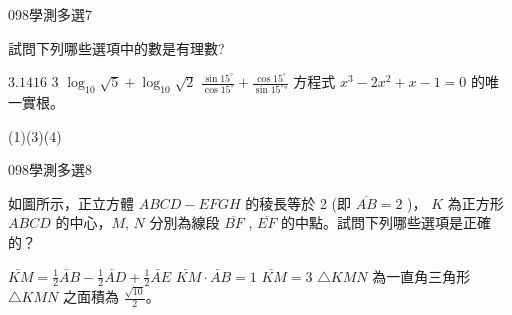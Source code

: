 \begin{QUESTIONS}
    \begin{QUESTION}
        \begin{ExamInfo}{098}{學測}{多選}{7}
        \end{ExamInfo}
        \begin{ExamAnsRateInfo}{39}{67}{35}{15}
        \end{ExamAnsRateInfo}
        \begin{QBODY}
			試問下列哪些選項中的數是有理數? 
			\begin{QOPS} 
				\QOP $3.1416$
				\QOP $3$ 
				\QOP $\log_{10} \sqrt{5}+ \log_{10}\sqrt{2}$ 
				\QOP $\frac{\sin{15^\circ}}{\cos{15^\circ}} +  \frac{\cos{15^\circ}}{\sin{15^\circ°}}$ \quad 
				\QOP 方程式 $x^3 - 2x^2 +x-1=0$ 的唯一實根。
			\end{QOPS}
        \end{QBODY}
        \begin{QFROMS}
        \end{QFROMS}
        \begin{QTAGS}\end{QTAGS}
        \begin{QANS}
            (1)(3)(4)
        \end{QANS}
        \begin{QSOLLIST}
        \end{QSOLLIST}
        \begin{QEMPTYSPACE}
        \end{QEMPTYSPACE}
    \end{QUESTION}
    \begin{QUESTION}
        \begin{ExamInfo}{098}{學測}{多選}{8}
        \end{ExamInfo}
        \begin{ExamAnsRateInfo}{46}{80}{42}{16}
        \end{ExamAnsRateInfo}
        \begin{QBODY}
			如圖所示，正立方體 $ABCD - EFGH$ 的稜長等於 2 (即 $\overline{AB} = 2$ )， $K$ 為正方形 $ABCD $ 的中心，$M$, $N$ 分別為線段 $\overline{BF}$ ,  $\overline{EF}$ 的中點。試問下列哪些選項是正確的？ 
			\begin{QOPS} 
				\QOP  $\lvec{KM} = \frac{1}{2} \lvec{AB} - \frac{1}{2} \lvec{AD} + \frac{1}{2} \lvec{AE}$ 
				\QOP $\lvec{KM} \cdot \lvec{AB}=1$ 
				\QOP $\lvec{KM}=3$ 
				\QOP  $\triangle KMN$ 為一直角三角形 
				\QOP $\triangle KMN$ 之面積為 $\frac{\sqrt{10}}{2}$。
			\end{QOPS}

\end{QBODY}
\end{QUESTION}
\end{QUESTIONS}
